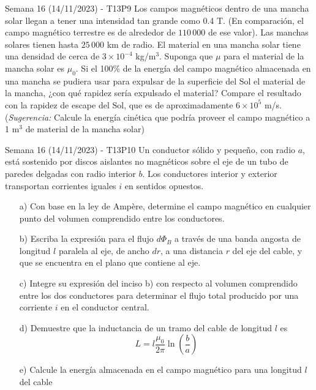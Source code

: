 \begin{frame}{Semana 16 (14/11/2023) - T13P9}
    Los campos magnéticos dentro
de una mancha solar llegan a tener una intensidad tan grande como 0.4 T. (En comparación, el campo magnético terrestre es de alrededor de $110\,000$ de ese valor). Las manchas solares tienen hasta $25\,000$ km
de radio. El material en una mancha solar tiene una densidad de cerca de $3 \times 10^{-4}$ kg/m$^3$. Suponga que $\mu$ para el material de la mancha
solar es $\mu_0$. Si el 100\% de la energía del campo magnético almacenada en una mancha se pudiera usar para expulsar de la superficie del Sol
el material de la mancha, ¿con qué rapidez sería expulsado el material?
Compare el resultado con la rapidez de escape del Sol, que es de aproximadamente $6 \times 10^5$ m/s. (\textit{Sugerencia:} Calcule la energía cinética que
podría proveer el campo magnético a 1 m$^3$ de material de la mancha
solar)
\end{frame}

\begin{frame}{Semana 16 (14/11/2023) - T13P10}
\small
    Un conductor sólido y pequeño,
con radio $a$, está sostenido por discos aislantes no magnéticos sobre el
eje de un tubo de paredes delgadas con radio interior $b$. Los conductores interior y exterior transportan corrientes iguales $i$ en sentidos
opuestos.
\begin{itemize}
    \item[a)] Con base en la ley de Ampère, determine el campo magnético en cualquier punto del volumen comprendido entre los conductores.
    \item[b)] Escriba la expresión para el flujo $d\Phi_B$ a través de una banda
angosta de longitud $l$ paralela al eje, de ancho $dr$, a una distancia $r$
del eje del cable, y que se encuentra en el plano que contiene al eje.
\item[c)]  Integre su expresión del inciso b) con respecto al volumen comprendido entre los dos conductores para determinar el flujo total producido
por una corriente $i$ en el conductor central.
\item[d)]  Demuestre que la inductancia de un tramo del cable de longitud $l$ es $$L=l\frac{\mu_0}{2\pi}\ln\left(\frac{b}{a}\right)$$
\item[e)] Calcule la energía almacenada en el campo magnético para una longitud $l$ del cable
\end{itemize}
\end{frame}

